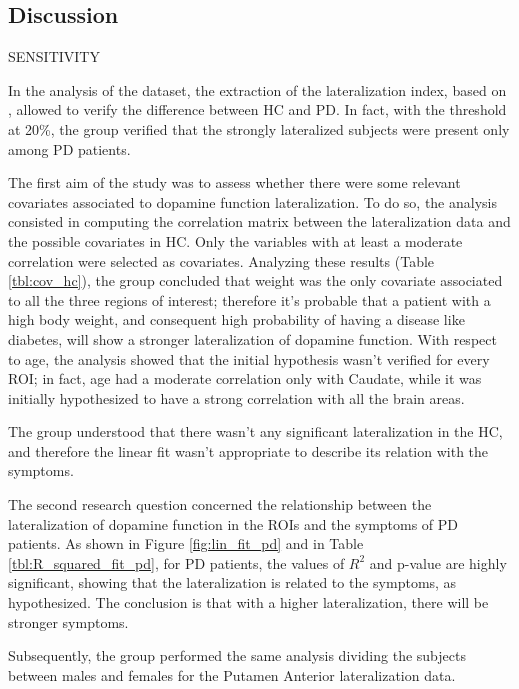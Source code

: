 \documentclass[]{article}
\begin{document}
\begin{multicols}{2}

\section{Discussion}

SENSITIVITY

In the analysis of the dataset, the extraction of the lateralization index, based on \cite{kaasinen_ipsilateral_2016}, allowed to verify the difference between HC and PD. In fact, with the threshold at 20\%, the group verified that the strongly lateralized subjects were present only among PD patients. 

The first aim of the study was to assess whether there were some relevant covariates associated to dopamine function lateralization. To do so, the analysis consisted in computing the correlation matrix between the lateralization data and the possible covariates in HC. Only the variables with at least a moderate correlation were selected as covariates. Analyzing these results (Table \ref{tbl:cov_hc}), the group concluded that weight was the only covariate associated to all the three regions of interest; therefore it's probable that a patient with a high body weight, and consequent high probability of having a disease like diabetes, will show a stronger lateralization of dopamine function. With respect to age, the analysis showed that the initial hypothesis wasn't verified for every ROI; in fact, age had a moderate correlation only with Caudate, while it was initially hypothesized to have a strong correlation with all the brain areas.

The group understood that there wasn't any significant lateralization in the HC, and therefore the linear fit wasn't appropriate to describe its relation with the symptoms.

The second research question concerned the relationship between the lateralization of dopamine function in the ROIs and the symptoms of PD patients.
As shown in Figure \ref{fig:lin_fit_pd} and in Table \ref{tbl:R_squared_fit_pd}, for PD patients, the values of $R^2$ and p-value are highly significant, showing that the lateralization is related to the symptoms, as hypothesized. The conclusion is that with a higher lateralization, there will be stronger symptoms.

Subsequently, the group performed the same analysis dividing the subjects between males and females for the Putamen Anterior lateralization data.


\end{multicols}
\end{document}
